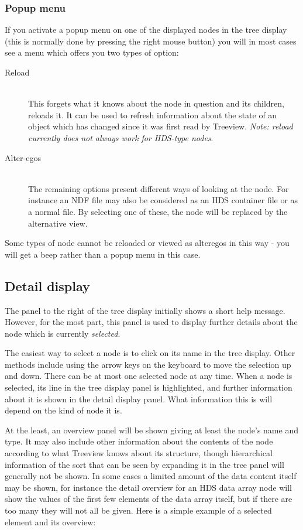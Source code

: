 \documentclass[twoside,11pt]{article}
\renewcommand{\_}{\texttt{\symbol{95}}}
\begin{document}
\subsubsection{Popup menu}

If you activate a popup menu on one of the displayed nodes in the
tree display (this is normally done by pressing the right mouse button)
you will in most cases see a menu which offers you two types of option:
\begin{description}
\item[Reload]\mbox{}\\
This forgets what it knows about the node in question and its children, 
reloads it.  It can be used to refresh information about the state
of an object which has changed since it was first read by Treeview.
{\it Note: reload currently does not always work for HDS-type nodes}.
\item[Alter-egos]\mbox{}\\
The remaining options present different ways of looking at the node.
For instance an NDF file may also be considered as an HDS container file
or as a normal file.  By selecting one of these, the node will be 
replaced by the alternative view.
\end{description}
Some types of node cannot be reloaded or viewed as alteregos in this
way - you will get a beep rather than a popup menu in this case.


\subsection{\label{sec:detail}Detail display}

The panel to the right of the tree display initially shows a short 
help message.  However, for the most part, this panel is used to
display further details about the node which is currently
{\em selected}.

The easiest way to select a node is to click on its name in the 
tree display.  Other methods include using the arrow keys on the
keyboard to move the selection up and down.  There can be at most
one selected node at any time.
When a node is selected, its line in the tree display panel is
highlighted, and further information about it is shown 
in the detail display panel.  What information this is will 
depend on the kind of node it is. 

At the least, an overview panel will be shown giving at least the
node's name and type.  It may also include other information 
about the contents of the node according to what Treeview knows
about its structure, though hierarchical information of the sort
that can be seen by expanding it in the tree panel will generally
not be shown.  In some cases a limited amount of the data content 
itself may be shown, for instance the detail overview for an HDS 
data array node will show the values of the first few elements of the 
data array itself, but if there are too many they will not all be given.
Here is a simple example of a selected element and its overview:
\end{document}
